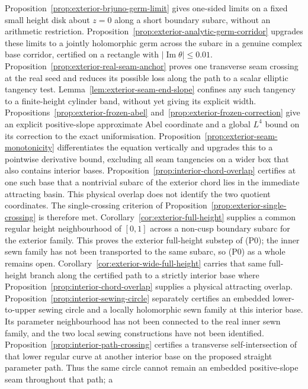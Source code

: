 \documentclass[11pt,a4paper]{article}
\theoremstyle{definition}
\begin{document}
Proposition~\ref{prop:exterior-brjuno-germ-limit} gives one-sided
limits on a fixed small height disk about $z=0$ along a short
boundary subarc, without an arithmetic restriction.
Proposition~\ref{prop:exterior-analytic-germ-corridor} upgrades these
limits to a jointly holomorphic germ across the subarc in a genuine
complex base corridor, certified on a rectangle with
$|\operatorname{Im}\theta|\le0.01$.
Proposition~\ref{prop:exterior-real-seam-anchor} proves one transverse
seam crossing at the real seed and reduces its possible loss along
the path to a scalar elliptic tangency test.
Lemma~\ref{lem:exterior-seam-end-slope} confines any such tangency
to a finite-height cylinder band, without yet giving its explicit
width.
Propositions~\ref{prop:exterior-frozen-abel}
and~\ref{prop:exterior-frozen-correction} give an explicit
positive-slope approximate Abel coordinate and a global $L^4$
bound on its correction to the exact uniformisation.
Proposition~\ref{prop:exterior-seam-monotonicity} differentiates the
equation vertically and upgrades this to a pointwise derivative
bound, excluding all seam tangencies on a wider box that also
contains interior bases.
Proposition~\ref{prop:interior-chord-overlap} certifies at one such
base that a nontrivial subarc of the exterior chord lies in the
immediate attracting basin.  This physical overlap does not
identify the two quotient coordinates.
The single-crossing criterion of
Proposition~\ref{prop:exterior-single-crossing} is therefore met.
Corollary~\ref{cor:exterior-full-height} supplies a common regular
height neighbourhood of $[0,1]$ across a non-cusp boundary subarc
for the exterior family.  This proves the exterior full-height
substep of (P0); the inner sewn family has not been transported
to the same subarc, so (P0) as a whole remains open.
Corollary~\ref{cor:exterior-wide-full-height} carries that same
full-height branch along the certified path to a strictly interior
base where Proposition~\ref{prop:interior-chord-overlap} supplies a
physical attracting overlap.
Proposition~\ref{prop:interior-sewing-circle} separately certifies an
embedded lower-to-upper sewing circle and a locally holomorphic sewn
family at this interior base.  Its parameter neighbourhood has not
been connected to the real inner sewn family, and the two local
sewing constructions have not been identified.
Proposition~\ref{prop:interior-path-crossing} certifies a transverse
self-intersection of that lower regular curve at another interior base
on the proposed straight parameter path.  Thus the same circle cannot
remain an embedded positive-slope seam throughout that path; a
\end{document}
